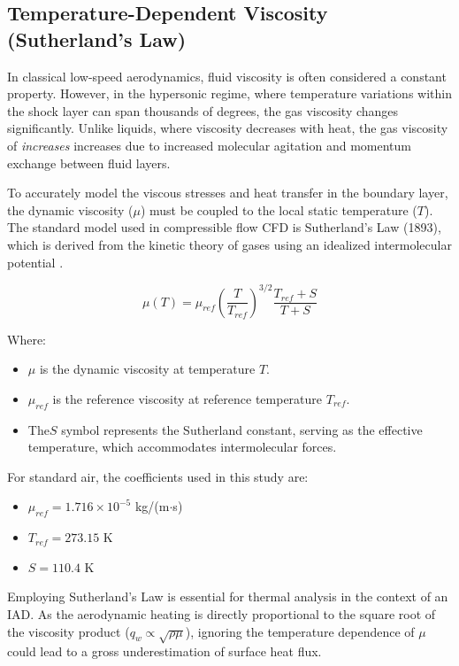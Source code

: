 \subsection{Temperature-Dependent Viscosity (Sutherland’s Law)}

In classical low-speed aerodynamics, fluid viscosity is often considered a constant property. However, in the hypersonic regime, where temperature variations within the shock layer can span thousands of degrees, the gas viscosity changes significantly. Unlike liquids, where viscosity decreases with heat, the gas viscosity of \textit{increases} increases due to increased molecular agitation and momentum exchange between fluid layers.
\par
To accurately model the viscous stresses and heat transfer in the boundary layer, the dynamic viscosity ($\mu$) must be coupled to the local static temperature ($T$). The standard model used in compressible flow CFD is Sutherland's Law (1893), which is derived from the kinetic theory of gases using an idealized intermolecular potential \cite{AndersonHypersonic}.

\begin{equation}
    \mu(T) = \mu_{ref} \left( \frac{T}{T_{ref}} \right)^{3/2} \frac{T_{ref} + S}{T + S}
    \label{eq:sutherland}
\end{equation}

Where:
\begin{itemize}
    \item $\mu$ is the dynamic viscosity at temperature $T$.

    \item $\mu_{ref}$ is the reference viscosity at reference temperature $T_{ref}$.

    \item The$S$ symbol represents the Sutherland constant, serving as the effective temperature, which accommodates intermolecular forces.
\end{itemize}

For standard air, the coefficients used in this study are:
\begin{itemize}
    \item $\mu_{ref} = 1.716 \times 10^{-5}$ kg/(m$\cdot$s)

    \item $T_{ref} = 273.15$ K

    \item $S = 110.4$ K
\end{itemize}

Employing Sutherland's Law is essential for thermal analysis in the context of an IAD. As the aerodynamic heating is directly proportional to the square root of the viscosity product ($q_w \propto \sqrt{\rho \mu}$), ignoring the temperature dependence of $\mu$ could lead to a gross underestimation of surface heat flux.

